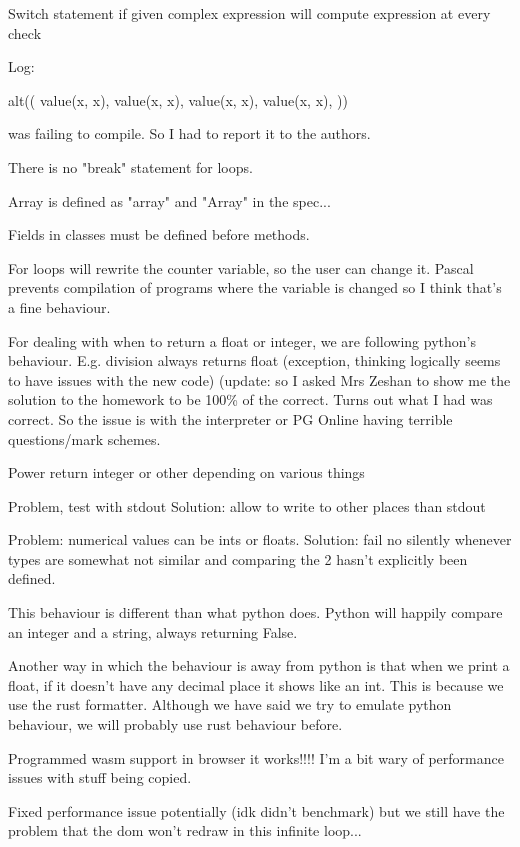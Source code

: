 \documentclass{article}
\begin{document}
Switch statement if given complex expression will compute expression at every
check

Log:


alt((
	value(x, x),
	value(x, x),
	value(x, x),
	value(x, x),
))

was failing to compile. So I had to report it to the authors.

There is no "break" statement for loops.

Array is defined as "array" and "Array" in the spec...

Fields in classes must be defined before methods.

For loops will rewrite the counter variable, so the user can change it.
Pascal prevents compilation of programs where the variable is changed so I
think that's a fine behaviour.

For dealing with when to return a float or integer, we are following python's
behaviour. E.g. division always returns float (exception, thinking logically
seems to have issues with the new code) (update: so I asked Mrs Zeshan to show
me the solution to the homework to be 100\% of the correct. Turns out what I
had was correct. So the issue is with the interpreter or PG Online having
terrible questions/mark schemes.

Power return integer or other depending on various things

Problem, test with stdout
Solution: allow to write to other places than stdout

Problem: numerical values can be ints or floats.
Solution: fail no silently whenever types are somewhat not similar and
comparing the 2 hasn't explicitly been defined.

This behaviour is different than what python does. Python will happily compare
an integer and a string, always returning False.

Another way in which the behaviour is away from python is that when we print a
float, if it doesn't have any decimal place it shows like an int. This is
because we use the rust formatter. Although we have said we try to emulate
python behaviour, we will probably use rust behaviour before.

Programmed wasm support in browser it works!!!! I'm a bit wary of performance
issues with stuff being copied.

Fixed performance issue potentially (idk didn't benchmark) but we still have
the problem that the dom won't redraw in this infinite loop...
\end{document}
